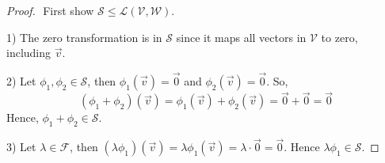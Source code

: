 \documentclass{article}
\begin{document}
\begin{proof}
$ $\newline
First show $\mathcal{S} \le \mathcal{L}(\mathcal{V}, \mathcal{W})$.

1) The zero transformation is in $\mathcal{S}$ since it maps all vectors in $\mathcal{V}$ to zero, including $\vec{v}$.

2) Let $\phi_1, \phi_2 \in \mathcal{S}$, then $\phi_1(\vec{v}) = \vec{0}$ and $\phi_2(\vec{v}) = \vec{0}$. So, $$(\phi_1+\phi_2) (\vec{v}) = \phi_1(\vec{v}) + \phi_2(\vec{v}) = \vec{0} + \vec{0} = \vec{0}$$ Hence, $\phi_1 +\phi_2 \in \mathcal{S}$.

3) Let $\lambda \in \mathcal{F}$, then $(\lambda \phi_1 )(\vec{v}) = \lambda \phi_1(\vec{v}) = \lambda \cdot \vec{0} =\vec{0}$. Hence $\lambda \phi_1 \in \mathcal{S}$.
\bigskip


\end{proof}
\end{document}
